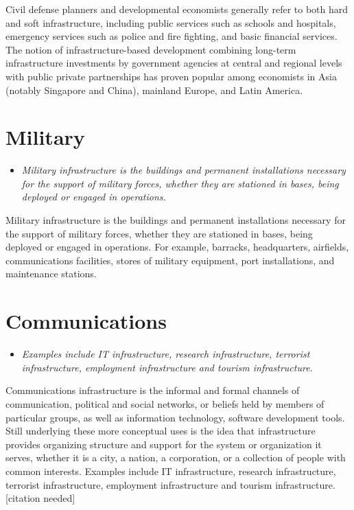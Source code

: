 Civil defense planners and developmental economists generally refer to
both hard and soft infrastructure, including public services such as
schools and hospitals, emergency services such as police and fire
fighting, and basic financial services. The notion of
infrastructure-based development combining long-term infrastructure
investments by government agencies at central and regional levels with
public private partnerships has proven popular among economists in Asia
(notably Singapore and China), mainland Europe, and Latin America.

\section{Military}\label{military}

\begin{itemize}
\item
  \emph{Military infrastructure is the buildings and permanent
  installations necessary for the support of military forces, whether
  they are stationed in bases, being deployed or engaged in operations.}
\end{itemize}

Military infrastructure is the buildings and permanent installations
necessary for the support of military forces, whether they are stationed
in bases, being deployed or engaged in operations. For example,
barracks, headquarters, airfields, communications facilities, stores of
military equipment, port installations, and maintenance stations.

\section{Communications}\label{communications}

\begin{itemize}
\item
  \emph{Examples include IT infrastructure, research infrastructure,
  terrorist infrastructure, employment infrastructure and tourism
  infrastructure.}
\end{itemize}

Communications infrastructure is the informal and formal channels of
communication, political and social networks, or beliefs held by members
of particular groups, as well as information technology, software
development tools. Still underlying these more conceptual uses is the
idea that infrastructure provides organizing structure and support for
the system or organization it serves, whether it is a city, a nation, a
corporation, or a collection of people with common interests. Examples
include IT infrastructure, research infrastructure, terrorist
infrastructure, employment infrastructure and tourism
infrastructure.{[}citation needed{]}

